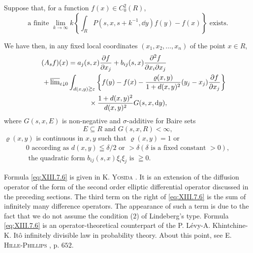 Suppose that, for a function $f(x) \in C_0^2(R)$, 
\begin{equation}\label{eq:XIII.7.5}
\text{ a finite } \lim\limits _{k \to \infty} k \left\{\int_{R} P (s, x, s + k ^{-1}, \dd y) f (y) - f (x) \right\} \text{ exists. }
\end{equation}

We have then, in any fixed local coordinates $(x_{1}, x_{2}, \ldots, x_{n})$ of the point $x \in R$, 
\begin{equation}\label{eq:XIII.7.6}
\begin{aligned}
(A _{s} f) (x)& = a _{j} (s, x) \frac {\partial f}{\partial x _{j}} + b _{ij} (s, x) \frac {\partial^{2} f}{\partial x _{i} \partial x _{j}}
\\
\qquad + \varlimsup\nolimits_{\varepsilon \downarrow 0}& \int_{d (x, y) \geqq \varepsilon} \left\{f (y) - f (x) - \frac {\varrho (x , y)}{1 + d (x , y) ^{2}} (y _{j} - x _{j}) \frac {\partial f}{\partial x _{j}} \right\}
\\
&\quad \qquad \times \frac {1 + d (x , y) ^{2}}{d (x , y) ^{2}} G (s, x, \mathop{}\!\mathrm{d} y),
\end{aligned}
\end{equation}
where 
$G(s, x, E)$ is non-negative and $\sigma$-additive for Baire sets 
\begin{equation}\label{eq:XIII.7.7}
E \subseteq R \text{ and } G (s, x, R) < \infty ,
\end{equation}
$\varrho(x, y)$ is continuous in $x, y$ such that $\varrho(x, y) = 1$ or 
\begin{gather}0 \text{ according as } d (x, y) \leqq \delta / 2 \text{ or } > \delta (\delta \text{ is a fixed constant } > 0), \label{eq:XIII.7.8}
\\\text{ the quadratic form } b _{ij} (s, x) \xi_{i} \xi_{j} \text{ is } \geqq 0. \label{eq:XIII.7.9}
\end{gather}

\begin{remarku} Formula \eqref{eq:XIII.7.6} is given in K. \textsc{Yosida} \cite{yosida369}. It is an extension of the diffusion operator of the form of the second order elliptic differential operator discussed in the preceding sections. The third term on the right of \eqref{eq:XIII.7.6} is the sum of infinitely many difference operators. The appearance of such a term is due to the fact that we do not assume the condition ($2$) of Lindeberg's type. Formula \eqref{eq:XIII.7.6} is an operator-theoretical counterpart of the P. Lévy-A. Khintchine-K. Itô infinitely divisible law in probability theory. About this point, see E. \textsc{Hille}-\textsc{Phillips} \cite{hille97}, p. $652$. 
\end{remarku}

